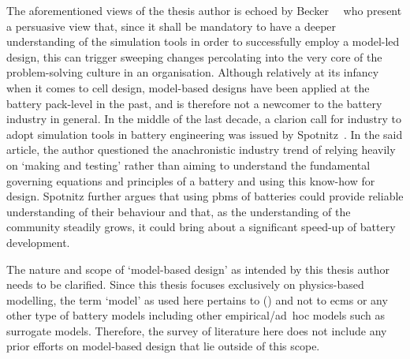 The   aforementioned    views   of    the   thesis    author   is    echoed   by
Becker~\etal~\cite{Becker2005}  who present  a  persuasive view  that, since  it
shall be  mandatory to have  a deeper understanding  of the simulation  tools in
order  to successfully  employ a  model-led  design, this  can trigger  sweeping
changes percolating  into the  very core  of the  problem-solving culture  in an
organisation. Although relatively  at its infancy when it comes  to cell design,
model-based designs have been applied at the battery pack-level in the past, and
is therefore not a newcomer to the battery industry in general. In the middle of
the  last decade,  a clarion  call  for industry  to adopt  simulation tools  in
battery  engineering was  issued  by Spotnitz~\cite{Spotnitz2005}.  In the  said
article,  the author  questioned  the anachronistic  industry  trend of  relying
heavily on `making and testing' rather than aiming to understand the fundamental
governing equations  and principles  of a  battery and  using this  know-how for
design.  Spotnitz  further argues  that  using  \glspl{pbm} of  batteries  could
provide reliable understanding of their behaviour and that, as the understanding
of the community steadily grows, it  could bring about a significant speed-up of
battery development.

The nature and  scope of `model-based design' as intended  by this thesis author
needs to  be clarified. Since  this thesis focuses exclusively  on physics-based
modelling,  the  term  `model'  as  used  here  pertains  to  
() and not to \glspl{ecm} or any other type of battery models
including other empirical/\mbox{ad hoc} models such as surrogate models. Therefore, the
survey of  literature here  does not  include any  prior efforts  on model-based
design that lie outside of this scope.

